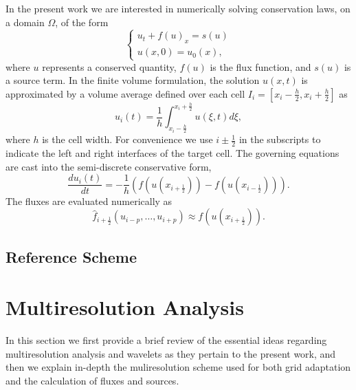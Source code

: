 \documentclass{article}
\begin{document}
    In the present work we are interested in numerically solving conservation
    laws, on a domain $\Omega$, of the form
    \begin{equation}
    \begin{cases}
      u_{t} + f(u)_{x} = s(u) \\    
      u(x,0) = u_{0}(x),
    \end{cases}
    \end{equation}
    where $u$ represents a conserved quantity, $f(u)$ is the flux function, and
    $s(u)$ is a source term. In the finite volume formulation, the solution
    $u(x,t)$ is approximated by a volume average defined over each cell $I_{i} =
    \left[ x_{i}-\frac{h}{2}, x_{i}+\frac{h}{2} \right]$ as
    \begin{equation}
        u_{i}(t) = \frac{1}{h} \int_{x_{i}-\frac{h}{2}}^{x_{i}+\frac{h}{2}} u(\xi,t) d \xi,
    \end{equation}
    where $h$ is the cell width. For convenience we use $i \pm \frac{1}{2}$ in
    the subscripts to indicate the left and right interfaces of the target cell.
    The governing equations are cast into the semi-discrete conservative form,
    \begin{equation}
        \frac{du_{i}(t)}{dt} = -\frac{1}{h} \left( f(u(x_{i+\frac{1}{2}})) -
        f(u(x_{i-\frac{1}{2}})) \right).
    \end{equation}
    The fluxes are evaluated numerically as
    \begin{equation}
       \hat{f}_{i + \frac{1}{2}}(u_{i-p}, \dots, u_{i+p}) \approx
        f(u(x_{i+\frac{1}{2}})).
    \end{equation}

    \subsection{Reference Scheme}


\section{Multiresolution Analysis}

    In this section we first provide a brief review of the essential ideas
    regarding multiresolution analysis and wavelets as they pertain to the
    present work, and then we explain in-depth the muliresolution scheme used
    for both grid adaptation and the calculation of fluxes and sources.
\end{document}
